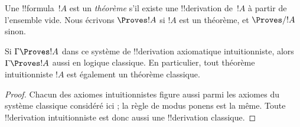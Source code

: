 \documentclass[../../../include/open-logic-section]{subfiles}
\begin{document}
\begin{defn}[Théorèmes]
Une !!{formula}~$!A$ est un \emph{théorème} s'il existe une
!!{derivation} de~$!A$ à partir de l'ensemble vide. Nous écrivons
$\Proves !A$ si $!A$ est un théorème, et $\Proves/ !A$ sinon.
\end{defn}

\begin{prop}
  Si $\Gamma \Proves !A$ dans ce système de !!{derivation}
  axiomatique intuitionniste, alors $\Gamma \Proves !A$ aussi
  en logique classique. En particulier, tout théorème
  intuitionniste $!A$ est également un théorème classique.
\end{prop}

\begin{proof}
  Chacun des axiomes intuitionnistes figure aussi parmi les
  axiomes du système classique considéré ici ; la règle de
  modus ponens est la même. Toute !!{derivation} intuitionniste
  est donc aussi une !!{derivation} classique.
\end{proof}
\end{document}
